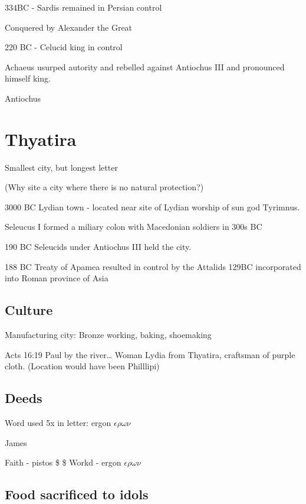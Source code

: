 \documentclass[
]{book}
\begin{document}
334BC - Sardis remained in Persian control

Conquered by Alexander the Great

220 BC - Celucid king in control

Achaeus usurped autority and rebelled against Antiochus III and pronounced himself king.

Antiochus

\hypertarget{thyatira}{%
\chapter{Thyatira}\label{thyatira}}

Smallest city, but longest letter

(Why site a city where there is no natural protection?)

3000 BC Lydian town - located near site of Lydian worship of sun god Tyrimnus.

Seleucus I formed a miliary colon with Macedonian soldiers in 300s BC

190 BC Seleucids under Antiochus III held the city.

188 BC Treaty of Apamea resulted in control by the Attalids
129BC incorporated into Roman province of Asia

\hypertarget{culture-1}{%
\section{Culture}\label{culture-1}}

Manufacturing city: Bronze working, baking, shoemaking

Acts 16:19 Paul by the river\ldots{} Woman Lydia from Thyatira, craftsman of purple cloth. (Location would have been Philllipi)

\hypertarget{deeds}{%
\section{Deeds}\label{deeds}}

Word used 5x in letter: ergon \(\epsilon \rho \omega \nu\)

James

Faith - pistos \$ \pi \iota \sigma \tau \omega \sigma \$
Workd - ergon \(\epsilon \rho \omega \nu\)

\hypertarget{food-sacrificed-to-idols}{%
\section{Food sacrificed to idols}\label{food-sacrificed-to-idols}}
\end{document}
